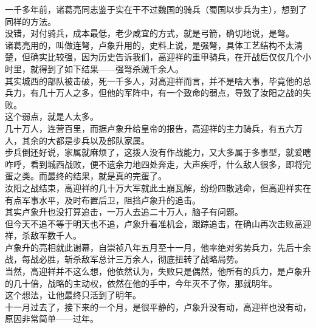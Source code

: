 \begin{multicols}{\theparacolNo}
一千多年前，诸葛亮同志鉴于实在干不过魏国的骑兵（蜀国以步兵为主），想到了同样的方法。\\

没错，对付骑兵，成本最低，老少咸宜的方式，就是弓箭，确切地说，是弩。\\

诸葛亮用的，叫做连弩，卢象升用的，史料上说，是强弩，具体工艺结构不太清楚，但确实比较强，因为历史告诉我们，高迎祥的重甲骑兵，在开战后仅仅几个小时里，就得到了如下结果——强弩杀贼千余人。\\

其实城西的部队被击破，死一千多人，对高迎祥而言，并不是啥大事，毕竟他的总兵力，有几十万人之多，但他的军阵中，有一个致命的弱点，导致了汝阳之战的失败。\\

这个弱点，就是人太多。\\

几十万人，连营百里，而据卢象升给皇帝的报告，高迎祥的主力骑兵，有五六万人，其余的大都是步兵以及部队家属。\\

步兵倒还好说，家属就麻烦了，这拨人没有作战能力，又大多属于多事型，就爱瞎咋呼，看到城西战败，便不遗余力地四处奔走，大声疾呼，什么敌人很多，即将完蛋之类。而最终的结果，就是真的完蛋了。\\

汝阳之战结束，高迎祥的几十万大军就此土崩瓦解，纷纷四散逃命，但高迎祥实在有点军事水平，及时布置后卫，阻挡卢象升的追击。\\

其实卢象升也没打算追击，一万人去追二十万人，脑子有问题。\\

但今天不追不等于明天也不追，卢象升看准机会，跟踪追击，在确山再次击败高迎祥，杀敌军数千人。\\

卢象升的亮相就此谢幕，自崇祯八年五月至十一月，他率绝对劣势兵力，先后十余战，每战必胜，斩杀敌军总计三万余人，彻底扭转了战略局势。\\

当然，高迎祥并不这么想，他依然认为，失败只是偶然，他所有的兵力，是卢象升的几十倍，战略的主动权，依然在他的手中，今年灭不了你，那就明年。\\

这个想法，让他最终只活到了明年。\\

十一月过去了，接下来的一个月，是很平静的，卢象升没有动，高迎祥也没有动，原因非常简单——过年。\\


\end{multicols}
